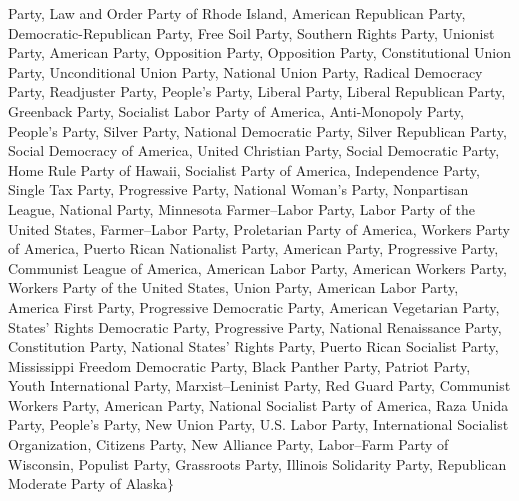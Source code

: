 \documentclass{classrep}
\begin{document}
Party, Law and Order Party of Rhode Island, American Republican Party, Democratic-Republican Party, Free Soil Party, Southern Rights Party, Unionist Party, American Party, Opposition Party, Opposition Party, Constitutional Union Party, Unconditional Union Party, National Union Party, Radical Democracy Party, Readjuster Party, People's Party, Liberal Party, Liberal Republican Party, Greenback Party, Socialist Labor Party of America, Anti-Monopoly Party, People's Party, Silver Party, National Democratic Party, Silver Republican Party, Social Democracy of America, United Christian Party, Social Democratic Party, Home Rule Party of Hawaii, Socialist Party of America, Independence Party, Single Tax Party, Progressive Party, National Woman's Party, Nonpartisan League, National Party, Minnesota Farmer–Labor Party, Labor Party of the United States, Farmer–Labor Party, Proletarian Party of America, Workers Party of America, Puerto Rican Nationalist Party, American Party, Progressive Party, Communist League of America, American Labor Party, American Workers Party, Workers Party of the United States, Union Party, American Labor Party, America First Party, Progressive Democratic Party, American Vegetarian Party, States' Rights Democratic Party, Progressive Party, National Renaissance Party, Constitution Party, National States' Rights Party, Puerto Rican Socialist Party, Mississippi Freedom Democratic Party, Black Panther Party, Patriot Party, Youth International Party, Marxist–Leninist Party, Red Guard Party, Communist Workers Party, American Party, National Socialist Party of America, Raza Unida Party, People's Party, New Union Party, U.S. Labor Party, International Socialist Organization, Citizens Party, New Alliance Party, Labor–Farm Party of Wisconsin, Populist Party, Grassroots Party, Illinois Solidarity Party, Republican Moderate Party of Alaska$\} $
\end{document}

